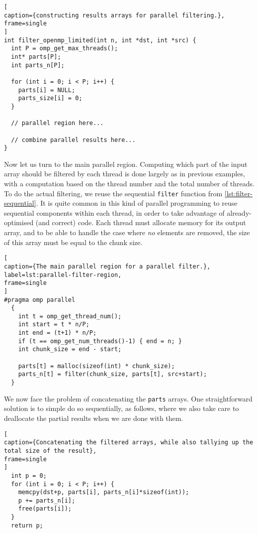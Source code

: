 \begin{lstlisting}[
caption={constructing results arrays for parallel filtering.},
frame=single
]
int filter_openmp_limited(int n, int *dst, int *src) {
  int P = omp_get_max_threads();
  int* parts[P];
  int parts_n[P];

  for (int i = 0; i < P; i++) {
    parts[i] = NULL;
    parts_size[i] = 0;
  }

  // parallel region here...

  // combine parallel results here...
}
\end{lstlisting}

Now let us turn to the main parallel region. Computing which part of
the input array should be filtered by each thread is done largely as
in previous examples, with a computation based on the thread number
and the total number of threads. To do the actual filtering, we reuse
the sequential \texttt{filter} function from
\cref{lst:filter-sequential}. It is quite common in this kind of
parallel programming to reuse sequential components within each
thread, in order to take advantage of already-optimised (and correct)
code. Each thread must allocate memory for its output array, and to be
able to handle the case where \emph{no} elements are removed, the size
of this array must be equal to the chunk size.

\begin{lstlisting}[
caption={The main parallel region for a parallel filter.},
label=lst:parallel-filter-region,
frame=single
]
#pragma omp parallel
  {
    int t = omp_get_thread_num();
    int start = t * n/P;
    int end = (t+1) * n/P;
    if (t == omp_get_num_threads()-1) { end = n; }
    int chunk_size = end - start;

    parts[t] = malloc(sizeof(int) * chunk_size);
    parts_n[t] = filter(chunk_size, parts[t], src+start);
  }
\end{lstlisting}

We now face the problem of concatenating the \texttt{parts} arrays.
One straightforward solution is to simple do so sequentially, as
follows, where we also take care to deallocate the partial results
when we are done with them.

\begin{lstlisting}[
caption={Concatenating the filtered arrays, while also tallying up the total size of the result},
frame=single
]
  int p = 0;
  for (int i = 0; i < P; i++) {
    memcpy(dst+p, parts[i], parts_n[i]*sizeof(int));
    p += parts_n[i];
    free(parts[i]);
  }
  return p;
\end{lstlisting}

